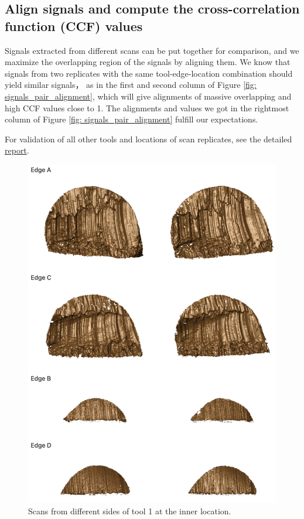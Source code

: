 \documentclass[fleqn,10pt]{wlscirep}
\begin{document}
\subsection*{Align signals and compute the cross-correlation function (CCF) values}

Signals extracted from different scans can be put together for
comparison, and we maximize the overlapping region of the signals by
aligning them. We know that signals from two replicates with the same
tool-edge-location combination should yield similar signals， as in the
first and second column of Figure \ref{fig: signals_pair_alignment},
which will give alignments of massive overlapping and high CCF values
close to 1. The alignments and values we got in the rightmost column of
Figure \ref{fig: signals_pair_alignment} fulfill our expectations.

For validation of all other tools and locations of scan replicates, see
the detailed
\href{https://heike.github.io/Wirecuts/data-descriptor/Technical_Validation.html}{report}.

\begin{figure}[ht]
\centering
\includegraphics[width=0.8\linewidth]{scans_pair.png}
\caption{Scans from different sides of tool 1 at the inner location.}
\label{fig: scans_pair}
\end{figure}
\end{document}
